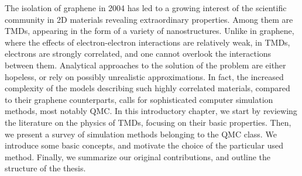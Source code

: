\label{cap:int}

\slshape

The isolation of graphene in 2004 has led to a growing interest of the scientific community in \ac{2D} materials revealing extraordinary properties.
Among them are \acp{TMD}, appearing in the form of a variety of nanostructures.
Unlike in graphene, where the effects of electron-electron interactions are relatively weak, in \acp{TMD}, electrons are strongly correlated, and one cannot overlook the interactions between them.
Analytical approaches to the solution of the problem are either hopeless, or rely on possibly unrealistic approximations.
In fact, the increased complexity of the models describing such highly correlated  materials, compared to their graphene counterparts, calls for sophisticated computer simulation methods, most notably \ac{QMC}.
In this introductory chapter, we start by  reviewing the literature on the physics of \acp{TMD}, focusing on their basic properties.
Then, we present a survey of simulation methods belonging to the \acl{QMC} class.
We introduce some basic concepts, and motivate the choice of the particular used  method.
Finally, we summarize our original contributions, and outline the structure of the thesis.

\normalfont








